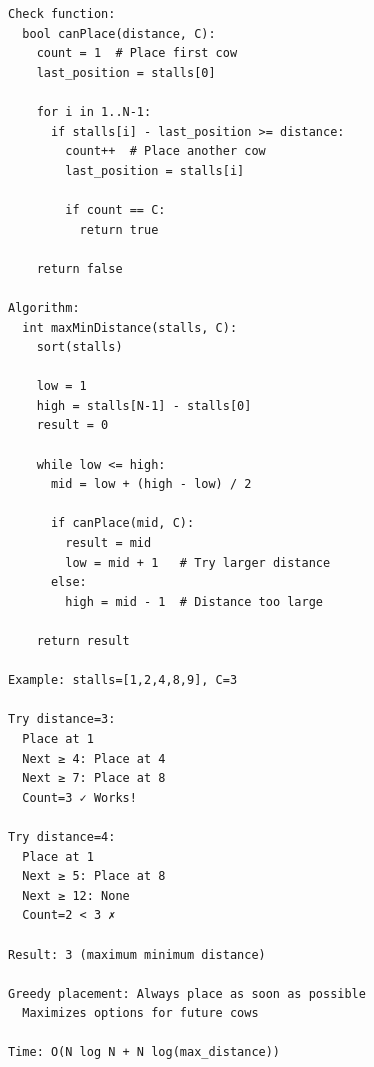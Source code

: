 \documentclass[11pt,a4paper,oneside]{book}
\begin{document}
\begin{tcolorbox}[
    enhanced,breakable,
    colback=successgreen!10,
    colframe=successgreen,
    boxrule=1.5pt,
    arc=3mm,
    title=\textbf{Complete Minimum Answer Algorithms}
]
\begin{verbatim}
Check function:
  bool canPlace(distance, C):
    count = 1  # Place first cow
    last_position = stalls[0]
    
    for i in 1..N-1:
      if stalls[i] - last_position >= distance:
        count++  # Place another cow
        last_position = stalls[i]
        
        if count == C:
          return true
    
    return false

Algorithm:
  int maxMinDistance(stalls, C):
    sort(stalls)
    
    low = 1
    high = stalls[N-1] - stalls[0]
    result = 0
    
    while low <= high:
      mid = low + (high - low) / 2
      
      if canPlace(mid, C):
        result = mid
        low = mid + 1   # Try larger distance
      else:
        high = mid - 1  # Distance too large
    
    return result

Example: stalls=[1,2,4,8,9], C=3

Try distance=3:
  Place at 1
  Next ≥ 4: Place at 4
  Next ≥ 7: Place at 8
  Count=3 ✓ Works!

Try distance=4:
  Place at 1
  Next ≥ 5: Place at 8
  Next ≥ 12: None
  Count=2 < 3 ✗

Result: 3 (maximum minimum distance)

Greedy placement: Always place as soon as possible
  Maximizes options for future cows

Time: O(N log N + N log(max_distance))
\end{verbatim}
\end{tcolorbox}
\end{document}
